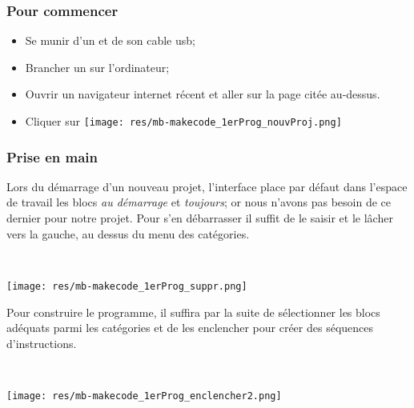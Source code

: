 \subsubsection{Pour commencer}

\begin{itemize}
  \item Se munir d'un \mb et de son cable usb;
  \item Brancher un \mb sur l'ordinateur;
  \item Ouvrir un navigateur internet récent et aller sur la page citée au-dessus.
  \item Cliquer sur \texttt{[image: res/mb-makecode\_1erProg\_nouvProj.png]}
\end{itemize}


\subsubsection{Prise en main}

\begin{minipage}[t]{0.75\linewidth}
Lors du démarrage d'un nouveau projet, l'interface place par défaut dans l'espace de travail les blocs \emph{au démarrage} et \emph{toujours}; or nous n'avons pas besoin de ce dernier pour notre projet. Pour s'en débarrasser il suffit de le saisir et le lâcher vers la gauche, au dessus du menu des catégories.
\end{minipage}
\hfill
\begin{minipage}[t]{0.25\linewidth}~\\
  \vspace{-5mm}
  \begin{center}
    \texttt{[image: res/mb-makecode\_1erProg\_suppr.png]}
  \end{center}
\end{minipage}

\newpage

\begin{minipage}[t]{0.75\linewidth}
Pour construire le programme, il suffira par la suite de sélectionner les blocs adéquats parmi les catégories et de les enclencher pour créer des séquences d'instructions.
\end{minipage}
\hfill
\begin{minipage}[t]{0.25\linewidth}~\\
  \vspace{-2mm}
  \begin{center}
    \texttt{[image: res/mb-makecode\_1erProg\_enclencher2.png]}
  \end{center}
\end{minipage}

